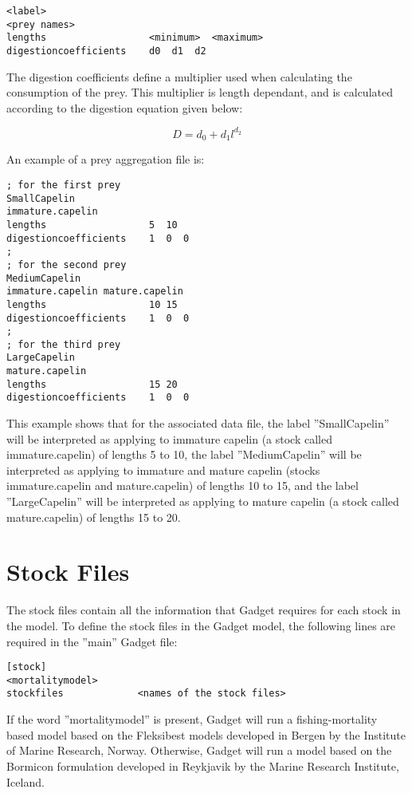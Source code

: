 \documentclass [a4paper, 10pt]{book}
\begin{document}
{\small\begin{verbatim}
<label>
<prey names>
lengths                  <minimum>  <maximum>
digestioncoefficients    d0  d1  d2
\end{verbatim}}

The digestion coefficients define a multiplier used when calculating the consumption of the prey.  This multiplier is length dependant, and is calculated according to the digestion equation given below:

\begin{equation}\label{eq:digestion}
D = d_{0} + d_{1}l^{d_{2}}
\end{equation}

\bigskip
An example of a prey aggregation file is:

{\small\begin{verbatim}
; for the first prey
SmallCapelin
immature.capelin
lengths                  5  10
digestioncoefficients    1  0  0
;
; for the second prey
MediumCapelin
immature.capelin mature.capelin
lengths                  10 15
digestioncoefficients    1  0  0
;
; for the third prey
LargeCapelin
mature.capelin
lengths                  15 20
digestioncoefficients    1  0  0
\end{verbatim}}

This example shows that for the associated data file, the label ''SmallCapelin'' will be interpreted as applying to immature capelin (a stock called immature.capelin) of lengths 5 to 10, the label ''MediumCapelin'' will be interpreted as applying to immature and mature capelin (stocks immature.capelin and mature.capelin) of lengths 10 to 15, and the label ''LargeCapelin'' will be interpreted as applying to mature capelin (a stock called mature.capelin) of lengths 15 to 20.

\chapter{Stock Files}\label{chap:stock}
The stock files contain all the information that Gadget requires for each stock in the model.  To define the stock files in the Gadget model, the following lines are required in the ''main'' Gadget file:

{\small\begin{verbatim}
[stock]
<mortalitymodel>
stockfiles             <names of the stock files>
\end{verbatim}}

If the word ''mortalitymodel'' is present, Gadget will run a fishing-mortality based model based on the Fleksibest models developed in Bergen by the Institute of Marine Research, Norway.  Otherwise, Gadget will run a model based on the Bormicon formulation developed in Reykjavik by the Marine Research Institute, Iceland.
\end{document}
